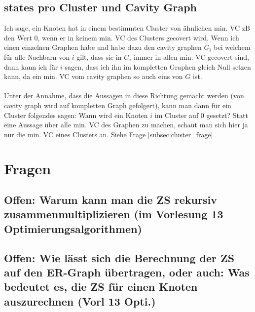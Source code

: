\documentclass[paper=a4,10pt]{scrartcl}
\begin{document}
\subsection{states pro Cluster und Cavity Graph}
Ich sage, ein Knoten hat in einem bestimmten Cluster von ähnlichen min. VC zB den Wert 0, wenn er in keinem min. VC des Clusters gecovert wird.
Wenn ich einen einzelnen Graphen habe und habe dazu den cavity graphen $G_i$ bei welchem für alle Nachbarn von $i$ gilt, dass sie in $G_i$ immer in allen min. VC gecovert sind, dann kann ich für $i$ sagen, dass ich ihn im kompletten Graphen gleich Null setzen kann, da ein min. VC vom cavity graphen so auch eins von $G$ ist.\\\\
Unter der Annahme, dass die Aussagen in diese Richtung gemacht werden (von cavity graph wird auf kompletten Graph gefolgert), kann man dann für ein Cluster folgendes sagen:
Wann wird ein Knoten $i$ im Cluster auf 0 gesetzt? Statt eine Aussage über alle min. VC des Graphen zu machen, schaut man sich hier ja nur die min. VC eines Clusters an.
Siehe Frage \ref{subsec:cluster_frage}


\section{Fragen}
\subsection{Offen: Warum kann man die ZS rekursiv zusammenmultiplizieren (im Vorlesung 13 Optimierungsalgorithmen)}

\subsection{Offen: Wie lässt sich die Berechnung der ZS auf den ER-Graph übertragen, oder auch: Was bedeutet es, die ZS für einen Knoten auszurechnen (Vorl 13 Opti.)}
\end{document}
